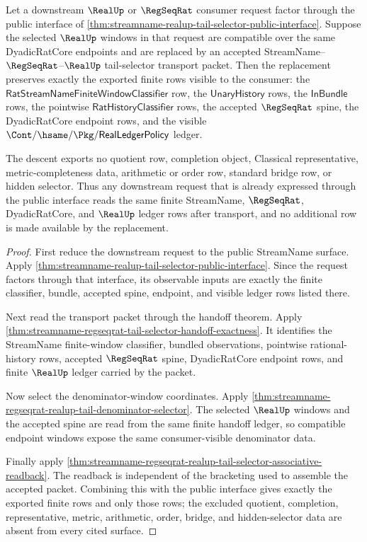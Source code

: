 \begin{theorem}
\label{thm:streamname-realup-tail-selector-public-interface-descent}
Let a downstream $\RealUp$ or $\RegSeqRat$ consumer request factor through the
public interface of
\autoref{thm:streamname-realup-tail-selector-public-interface}. Suppose the
selected $\RealUp$ windows in that request are compatible over the same
DyadicRatCore endpoints and are replaced by an accepted
StreamName--$\RegSeqRat$--$\RealUp$ tail-selector transport packet. Then the
replacement preserves exactly the exported finite rows visible to the consumer:
the $\mathsf{RatStreamNameFiniteWindowClassifier}$ row, the
$\mathsf{UnaryHistory}$ rows, the $\mathsf{InBundle}$ rows, the pointwise
$\mathsf{RatHistoryClassifier}$ rows, the accepted $\RegSeqRat$ spine, the
DyadicRatCore endpoint rows, and the visible
$\Cont/\hsame/\Pkg/\mathsf{RealLedgerPolicy}$ ledger.

The descent exports no quotient row, completion object, Classical
representative, metric-completeness data, arithmetic or order row, standard
bridge row, or hidden selector. Thus any downstream request that is already
expressed through the public interface reads the same finite StreamName,
$\RegSeqRat$, DyadicRatCore, and $\RealUp$ ledger rows after transport, and no
additional row is made available by the replacement.
\end{theorem}
\begin{proof}
First reduce the downstream request to the public StreamName surface. Apply
\autoref{thm:streamname-realup-tail-selector-public-interface}. Since the
request factors through that interface, its observable inputs are exactly the
finite classifier, bundle, accepted spine, endpoint, and visible ledger rows
listed there.

Next read the transport packet through the handoff theorem. Apply
\autoref{thm:streamname-regseqrat-tail-selector-handoff-exactness}. It
identifies the StreamName finite-window classifier, bundled observations,
pointwise rational-history rows, accepted $\RegSeqRat$ spine, DyadicRatCore
endpoint rows, and finite $\RealUp$ ledger carried by the packet.

Now select the denominator-window coordinates. Apply
\autoref{thm:streamname-regseqrat-realup-tail-denominator-selector}. The
selected $\RealUp$ windows and the accepted spine are read from the same
finite handoff ledger, so compatible endpoint windows expose the same
consumer-visible denominator data.

Finally apply
\autoref{thm:streamname-regseqrat-realup-tail-selector-associative-readback}.
The readback is independent of the bracketing used to assemble the accepted
packet. Combining this with the public interface gives exactly the exported
finite rows and only those rows; the excluded quotient, completion,
representative, metric, arithmetic, order, bridge, and hidden-selector data are
absent from every cited surface.
\end{proof}

